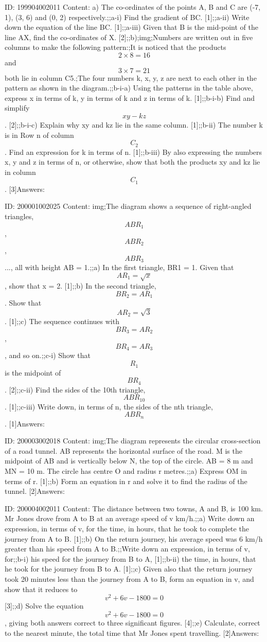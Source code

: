 \documentclass{article}
\begin{document}
ID: 199904002011
Content:
a) The co-ordinates of the points A, B and C are (-7, 1), (3, 6) and (0, 2) respectively.;;a-i) Find the gradient of BC. [1];;a-ii) Write down the equation of the line BC. [1];;a-iii) Given that B is the mid-point of the line AX, find the co-ordinates of X. [2];;b);img;Numbers are written out in five columns to make the following pattern:;It is noticed that the products $$2 \times 8 =16$$ and $$3 \times 7 =21$$ both lie in column C5.;The four numbers k, x, y, z are next to each other in the pattern as shown in the diagram.;;b-i-a) Using the patterns in the table above, express x in terms of k, y in terms of k and z in terms of k. [1];;b-i-b) Find and simplify $$xy - kz$$. [2];;b-i-c) Explain why xy and kz lie in the same column. [1];;b-ii) The number k is in Row n of column $$C_2$$. Find an expression for k in terms of n. [1];;b-iii) By also expressing the numbers x, y and z in terms of n, or otherwise, show that both the products xy and kz lie in column $$C_1$$. [3]Answers:

ID: 200001002025
Content:
img;The diagram shows a sequence of right-angled triangles, $$ABR_1$$, $$ABR_2$$, $$ABR_3$$ ..., all with height AB = 1.;;a) In the first triangle, BR1 = 1. Given that $$AR_1=\sqrt{x}$$, show that x = 2. [1];;b) In the second triangle, $$BR_2=AR_1$$. Show that $$AR_2=\sqrt{3}$$. [1];;c) The sequence continues with $$BR_3=AR_2$$, $$BR_4=AR_3$$, and so on.;;c-i) Show that $$R_1$$ is the midpoint of $$BR_4$$. [2];;c-ii) Find the sides of the 10th triangle, $$ABR_{10}$$. [1];;c-iii) Write down, in terms of n, the sides of the nth triangle, $$ABR_{n}$$. [1]Answers:

ID: 200003002018
Content:
img;The diagram represents the circular cross-section of a road tunnel. AB represents the horizontal surface of the road. M is the midpoint of AB and is vertically below N, the top of the circle. AB = 8 m and MN = 10 m. The circle has centre O and radius r metres.;;a) Express OM in terms of r. [1];;b) Form an equation in r and solve it to find the radius of the tunnel. [2]Answers:

ID: 200004002011
Content:
The distance between two towns, A and B, is 100 km. Mr Jones drove from A to B at an average speed of v km/h.;;a) Write down an expression, in terms of v, for the time, in hours, that he took to complete the journey from A to B. [1];;b) On the return journey, his average speed was 6 km/h greater than his speed from A to B.;;Write down an expression, in terms of v, for;;b-i) his speed for the journey from B to A, [1];;b-ii) the time, in hours, that he took for the journey from B to A. [1];;c) Given also that the return journey took 20 minutes less than the journey from A to B, form an equation in v, and show that it reduces to $$v^2 + 6v - 1800 = 0$$ [3];;d) Solve the equation $$v^2 + 6v - 1800 = 0$$, giving both answers correct to three significant figures. [4];;e) Calculate, correct to the nearest minute, the total time that Mr Jones spent travelling. [2]Answers:
\end{document}
